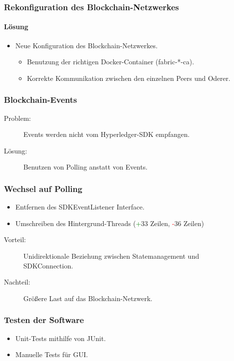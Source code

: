 \documentclass{beamer}
\begin{document}
\begin{frame}
\frametitle{Rekonfiguration des Blockchain-Netzwerkes}
\framesubtitle{Lösung}
	\begin{itemize}
		\item Neue Konfiguration des Blockchain-Netzwerkes.
		\begin{itemize}
			\item Benutzung der richtigen Docker-Container (fabric-*-ca).
			\item Korrekte Kommunikation zwischen den einzelnen Peers und Oderer.
		\end{itemize}
	\end{itemize}
\end{frame}

\begin{frame}
\frametitle{Blockchain-Events}
	\begin{description}
		\item[Problem:] Events werden nicht vom Hyperledger-SDK empfangen.
		\item[Lösung:] Benutzen von Polling anstatt von Events.
	\end{description}
\end{frame}

\begin{frame}
\frametitle{Wechsel auf Polling}
	\begin{itemize}
		\item Entfernen des SDKEventListener Interface.
		\item Umschreiben des Hintergrund-Threads (\textcolor{green}{+}33 Zeilen, \textcolor{red}{-}36 Zeilen)
	\end{itemize}		
	\pause
	\begin{description}
		\item[Vorteil:] Unidirektionale Beziehung zwischen Statemanagement und SDKConnection.
		\item[Nachteil:] Größere Last auf das Blockchain-Netzwerk.
	\end{description}
\end{frame}

\begin{frame}
\frametitle{Testen der Software}
	\begin{itemize}
		\item Unit-Tests mithilfe von JUnit.
		\item Manuelle Tests für GUI.
	\end{itemize}
\end{frame}
\end{document}
